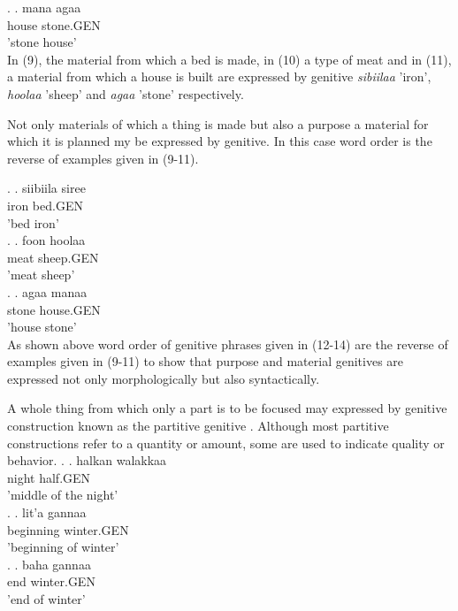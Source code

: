\documentclass[11pt,a4paper]{article}
\begin{document}
	\ex.
	\ag.
	mana agaa\\
	house stone.GEN\\
	'stone house'\\
	
	In (9), the material from which a bed is made, in (10) a type of meat and in (11), a material from which a house is built are expressed by genitive \emph{sibiilaa} 'iron', \emph{hoolaa} 'sheep' and \emph{agaa} 'stone' respectively.
	
	Not only materials of which a thing is made but also a purpose a material for which it is planned my be expressed by genitive. In this case word order is the reverse of examples given in (9-11).
	
	\ex.
	\ag.
	siibiila siree\\
	iron bed.GEN\\
	'bed iron'\\
	
	\ex.
	\ag.
	foon hoolaa\\
	meat sheep.GEN\\
	'meat sheep'\\
	
	\ex.
	\ag.
	agaa manaa\\
	stone house.GEN\\
	'house stone'\\
	
	As shown above word order of genitive phrases given in (12-14) are the reverse of examples given in (9-11) to show that purpose and material genitives are expressed not only morphologically but also syntactically.
	
	A whole thing from which only a part is to be focused may expressed by genitive construction known as the partitive genitive \cite[:69]{greenlee1950genitive}. Although most partitive 
	constructions refer to a quantity or amount, some are used to indicate quality or behavior.  
	\ex.
	\ag.
	halkan walakkaa\\
	night half.GEN\\
	'middle of the night'\\
	
	\ex.
	\ag.
	lit'a gannaa \\
	beginning winter.GEN\\
	'beginning of winter'\\
	
	\ex.
	\ag.
	baha gannaa\\
	end winter.GEN\\
	'end of winter'\\
	
\end{document}
